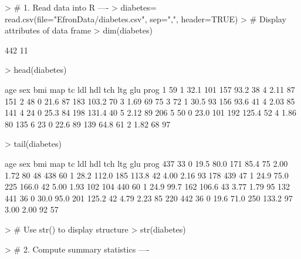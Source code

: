 \documentclass{article}
\begin{document}
\begin{Schunk}
\begin{Sinput}
> # 1.  Read data into R ----
> diabetes= read.csv(file="EfronData/diabetes.csv", sep=",", header=TRUE)
> #   Display attributes of data frame
> dim(diabetes)
\end{Sinput}
\begin{Soutput}
[1] 442  11
\end{Soutput}
\begin{Sinput}
> head(diabetes)
\end{Sinput}
\begin{Soutput}
  age sex  bmi map  tc   ldl hdl tch  ltg glu prog
1  59   1 32.1 101 157  93.2  38   4 2.11  87  151
2  48   0 21.6  87 183 103.2  70   3 1.69  69   75
3  72   1 30.5  93 156  93.6  41   4 2.03  85  141
4  24   0 25.3  84 198 131.4  40   5 2.12  89  206
5  50   0 23.0 101 192 125.4  52   4 1.86  80  135
6  23   0 22.6  89 139  64.8  61   2 1.82  68   97
\end{Soutput}
\begin{Sinput}
> tail(diabetes)
\end{Sinput}
\begin{Soutput}
    age sex  bmi   map  tc   ldl hdl  tch  ltg glu prog
437  33   0 19.5  80.0 171  85.4  75 2.00 1.72  80   48
438  60   1 28.2 112.0 185 113.8  42 4.00 2.16  93  178
439  47   1 24.9  75.0 225 166.0  42 5.00 1.93 102  104
440  60   1 24.9  99.7 162 106.6  43 3.77 1.79  95  132
441  36   0 30.0  95.0 201 125.2  42 4.79 2.23  85  220
442  36   0 19.6  71.0 250 133.2  97 3.00 2.00  92   57
\end{Soutput}
\begin{Sinput}
> #   Use str() to display structure
> str(diabetes)
\end{Sinput}
\begin{Sinput}
> # 2. Compute summary statistics ----

\end{Sinput}
\end{Schunk}
\end{document}
